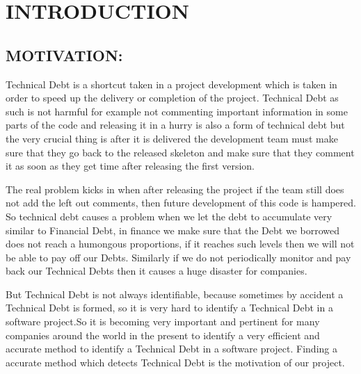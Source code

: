 
\chapter{\uppercase{Introduction}} %
\label{intro} %
\section{\uppercase{Motivation:}}
Technical Debt is a shortcut taken in a project development which is taken in order to speed up the delivery or completion of the project. Technical Debt as such is not harmful for example not commenting important information in some parts of the code and releasing it in a hurry is also a form of technical debt but the very crucial thing is after it is delivered the development team must make sure that they go back to the released skeleton and make sure that they comment it as soon as they get time after releasing the first version.
\par The real problem kicks in when after releasing the project if the team still does not add the left out comments, then future development of this code is hampered. So technical debt causes a problem when we let the debt to accumulate very similar to Financial Debt, in finance we make sure that the Debt we borrowed does not reach a humongous proportions, if it reaches such levels then we will not be able to pay off our Debts. Similarly if we do not periodically monitor and pay back our Technical Debts then it causes a huge disaster for companies.
\par But Technical Debt is not always identifiable, because sometimes by accident a Technical Debt is formed, so it is very hard to identify a Technical Debt in a software project.So it is becoming very important and pertinent for many companies around the world in the present to identify a very efficient and accurate method to identify a Technical Debt in a software project. Finding a accurate method which detects Technical Debt is the motivation of our project.
